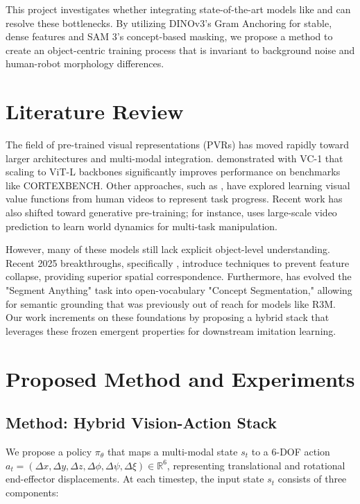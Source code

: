 \documentclass[conference]{IEEEtran}
\begin{document}
This project investigates whether integrating state-of-the-art models like \cite{simeoni2025dinov3} and \cite{carion2025sam3segmentconcepts} can resolve these bottlenecks. By utilizing DINOv3’s Gram Anchoring for stable, dense features and SAM 3’s concept-based masking, we propose a method to create an object-centric training process that is invariant to background noise and human-robot morphology differences.

\section{Literature Review}
The field of pre-trained visual representations (PVRs) has moved rapidly toward larger architectures and multi-modal integration. \cite{majumdar2023vc1} demonstrated with VC-1 that scaling to ViT-L backbones significantly improves performance on benchmarks like CORTEXBENCH. Other approaches, such as \cite{ma2023vipuniversalvisualreward}, have explored learning visual value functions from human videos to represent task progress. Recent work has also shifted toward generative pre-training; for instance, \cite{wu2023unleashinglargescalevideogenerative} uses large-scale video prediction to learn world dynamics for multi-task manipulation.

However, many of these models still lack explicit object-level understanding. Recent 2025 breakthroughs, specifically \cite{simeoni2025dinov3}, introduce techniques to prevent feature collapse, providing superior spatial correspondence. Furthermore, \cite{carion2025sam3segmentconcepts} has evolved the "Segment Anything" task into open-vocabulary "Concept Segmentation," allowing for semantic grounding that was previously out of reach for models like R3M. Our work increments on these foundations by proposing a hybrid stack that leverages these frozen emergent properties for downstream imitation learning.

\section{Proposed Method and Experiments}

\subsection{Method: Hybrid Vision-Action Stack}
We propose a policy $\pi_\theta$ that maps a multi-modal state $s_t$ to a 6-DOF action $a_t = (\Delta x, \Delta y, \Delta z, \Delta \phi, \Delta \psi, \Delta \xi) \in \mathbb{R}^6$, representing translational and rotational end-effector displacements. At each timestep, the input state $s_t$ consists of three components:
\end{document}
